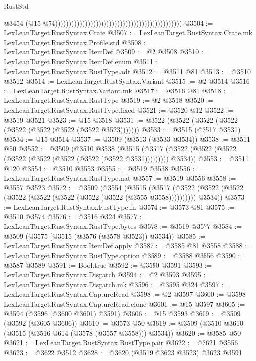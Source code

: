 \begin{lexlean}{RustStd}
\begin{coremodule}
                                                                                                @3454
                                                                                                (@15
                                                                                                  @74)))))))))))))))))))))))))))))))))))))))))))))))
@3504 := LexLeanTarget.RustSyntax.Crate
@3507 := LexLeanTarget.RustSyntax.Crate.mk LexLeanTarget.RustSyntax.Profile.std
@3508 := LexLeanTarget.RustSyntax.ItemDef
@3509 := @2 @3508
@3510 := LexLeanTarget.RustSyntax.ItemDef.enum
@3511 := LexLeanTarget.RustSyntax.RustType.adt
@3512 := @3511 @81
@3513 := @3510 @3512
@3514 := LexLeanTarget.RustSyntax.Variant
@3515 := @2 @3514
@3516 := LexLeanTarget.RustSyntax.Variant.mk
@3517 := @3516 @81
@3518 := LexLeanTarget.RustSyntax.RustType
@3519 := @2 @3518
@3520 := LexLeanTarget.RustSyntax.RustType.fixed
@3521 := @3520 @12
@3522 := @3519 @3521
@3523 := @15 @3518
@3531 := @3522 (@3522 (@3522 (@3522 (@3522 (@3522 (@3522 (@3522 @3523)))))))
@3533 := @3515 (@3517 @3531)
@3534 := @15 @3514
@3537 := @3509 (@3513 (@3533 @3534))
@3538 := @3511 @50
@3552 := @3509
    (@3510
      @3538
      (@3515 (@3517 (@3522 (@3522 (@3522 (@3522 (@3522 (@3522 (@3522 (@3522 @3531))))))))) @3534))
@3553 := @3511 @120
@3554 := @3510 @3553
@3555 := @3519 @3538
@3556 := LexLeanTarget.RustSyntax.RustType.nat
@3557 := @3519 @3556
@3558 := @3557 @3523
@3572 := @3509
    (@3554
      (@3515
        (@3517 (@3522 (@3522 (@3522 (@3522 (@3522 (@3522 (@3522 (@3522 (@3555 @3558))))))))))
        @3534))
@3573 := LexLeanTarget.RustSyntax.RustType.fn
@3574 := @3573 @81
@3575 := @3510 @3574
@3576 := @3516 @324
@3577 := LexLeanTarget.RustSyntax.RustType.bytes
@3578 := @3519 @3577
@3584 := @3509 (@3575 (@3515 (@3576 (@3578 @3523)) @3534))
@3585 := LexLeanTarget.RustSyntax.ItemDef.apply
@3587 := @3585 @81 @3558
@3588 := LexLeanTarget.RustSyntax.RustType.option
@3589 := @3588 @3556
@3590 := @3587 @3589
@3591 := Bool.true
@3592 := @3590 @3591
@3593 := LexLeanTarget.RustSyntax.Dispatch
@3594 := @2 @3593
@3595 := LexLeanTarget.RustSyntax.Dispatch.mk
@3596 := @3595 @324
@3597 := LexLeanTarget.RustSyntax.CaptureRead
@3598 := @2 @3597
@3600 := @3598 LexLeanTarget.RustSyntax.CaptureRead.clone
@3601 := @15 @3597
@3605 := @3594 (@3596 (@3600 @3601) @3591)
@3606 := @15 @3593
@3609 := @3509 (@3592 (@3605 @3606))
@3610 := @3573 @50
@3619 := @3509 (@3510 @3610 (@3515 (@3516 @614 (@3578 (@3557 @3558))) @3534))
@3620 := @3585 @50
@3621 := LexLeanTarget.RustSyntax.RustType.pair
@3622 := @3621 @3556
@3623 := @3622 @3512
@3628 := @3620 (@3519 @3623 @3523) @3623 @3591

\end{coremodule}
\end{lexlean}
